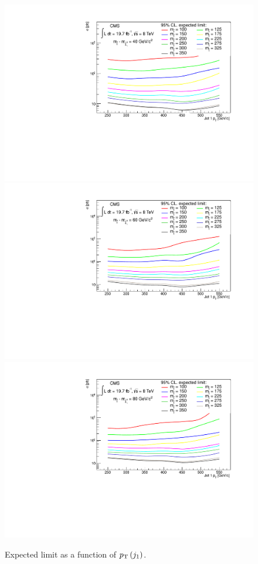 \begin{figure}[!Hhtb]
\begin{center}
  \includegraphics[scale=0.39]{Figures/sus13009/limits/optimisation_Limit_40.pdf}
  \includegraphics[scale=0.39]{Figures/sus13009/limits/optimisation_Limit_60.pdf}
  \includegraphics[scale=0.39]{Figures/sus13009/limits/optimisation_Limit_80.pdf}
  \caption{Expected limit as a function of $p_{\text{T}}\,(j_{1})$\GeV.}
  \label{fig:opt_DM}
  \end{center}
\end{figure}

